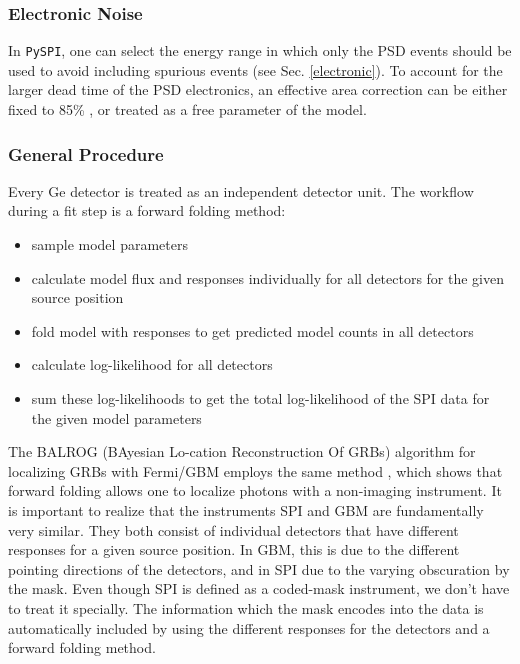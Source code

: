 \documentclass[twocolumn,traditabstract]{aa}
\begin{document}
\subsubsection{Electronic Noise}

In {\tt PySPI}, one can select the energy range in which only the PSD events should be used to avoid including spurious events (see Sec. \ref{electronic}). To account for the larger dead time of the PSD electronics, an effective area correction can be either fixed to 85\% \citep{spi_electronic_noise}, or treated as a free parameter of the model.

\subsubsection{General Procedure}

Every Ge detector is treated as an independent detector unit. The workflow during a fit step is a forward folding method:
\begin{itemize}
  \vspace{-0.2cm}
  \item sample model parameters
  \item calculate model flux and responses individually for all detectors for the given source position
  \item fold model with responses to get predicted model counts in all detectors
  \item calculate log-likelihood for all detectors
  \item sum these log-likelihoods to get the total log-likelihood of the SPI data for the given model parameters
\end{itemize}

\noindent
The BALROG (BAyesian Lo-cation Reconstruction Of GRBs) algorithm for localizing GRBs with Fermi/GBM employs the same method \citep{balrog}, which shows that forward folding allows one to localize photons with a non-imaging instrument. It is important to realize that the instruments SPI and GBM are fundamentally very similar. They both consist of individual detectors that have different responses for a given source position. In GBM, this is due to the different pointing directions of the detectors, and in SPI due to the varying obscuration by the mask. Even though SPI is defined as a coded-mask instrument, we don't have to treat it specially. The information which the mask encodes into the data is automatically included by using the different responses for the detectors and a forward folding method.
\end{document}
